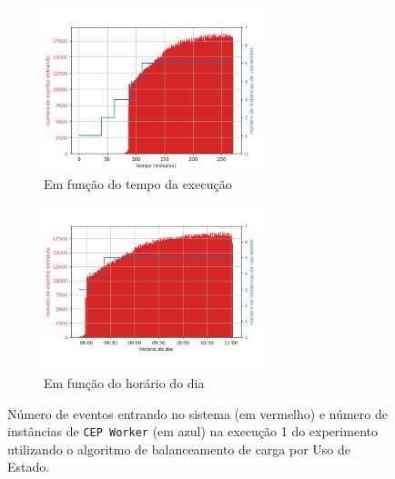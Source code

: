 \begin{figure}[h]
\centering
\vspace{5cm}
\begin{subfigure}{\textwidth}
\centering
\includegraphics[width=0.7\textwidth]{figuras/graphics/carga_e_workers_total5-dez-su.png}
\caption{Em função do tempo da execução}
\label{fig:workers_and_load_total-5-dez-su}
\end{subfigure}%

\begin{subfigure}{\textwidth}
\centering
\includegraphics[width=0.7\textwidth]{figuras/graphics/carga_e_workers_horario5-dez-su.png}
\caption{Em função do horário do dia}
\label{fig:workers_and_load_SPtrans-5-dez-su}
\end{subfigure}%
\caption{Número de eventos entrando no sistema (em vermelho) e número de instâncias de \texttt{CEP Worker} (em azul) na execução 1 do experimento utilizando o algoritmo de balanceamento de carga por Uso de Estado.}
\end{figure}



